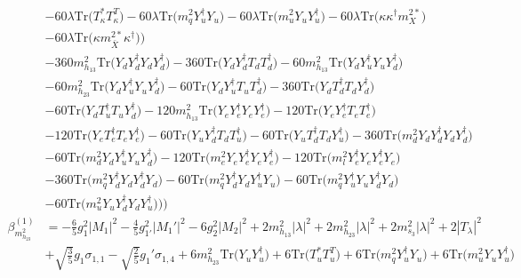 {\begin{align}
 &-60 \lambda \mbox{Tr}\Big({T_{\kappa}^*  T_{\kappa}^{T}}\Big) -60 \lambda \mbox{Tr}\Big({m_q^2  Y_{u}^{\dagger}  Y_u}\Big) -60 \lambda \mbox{Tr}\Big({m_u^2  Y_u  Y_{u}^{\dagger}}\Big) -60 \lambda \mbox{Tr}\Big({\kappa  \kappa^{\dagger}  m_{X}^{2 *}}\Big) \nonumber \\ 
 &-60 \lambda \mbox{Tr}\Big({\kappa  m_{\bar{X}}^{2 *}  \kappa^{\dagger}}\Big) \Big)\nonumber \\ 
 &-360 m_{h_{13}}^2 \mbox{Tr}\Big({Y_d  Y_{d}^{\dagger}  Y_d  Y_{d}^{\dagger}}\Big) -360 \mbox{Tr}\Big({Y_d  Y_{d}^{\dagger}  T_d  T_{d}^{\dagger}}\Big) -60 m_{h_{13}}^2 \mbox{Tr}\Big({Y_d  Y_{u}^{\dagger}  Y_u  Y_{d}^{\dagger}}\Big) \nonumber \\ 
 &-60 m_{h_{23}}^2 \mbox{Tr}\Big({Y_d  Y_{u}^{\dagger}  Y_u  Y_{d}^{\dagger}}\Big) -60 \mbox{Tr}\Big({Y_d  Y_{u}^{\dagger}  T_u  T_{d}^{\dagger}}\Big) -360 \mbox{Tr}\Big({Y_d  T_{d}^{\dagger}  T_d  Y_{d}^{\dagger}}\Big) \nonumber \\ 
 &-60 \mbox{Tr}\Big({Y_d  T_{u}^{\dagger}  T_u  Y_{d}^{\dagger}}\Big) -120 m_{h_{13}}^2 \mbox{Tr}\Big({Y_e  Y_{e}^{\dagger}  Y_e  Y_{e}^{\dagger}}\Big) -120 \mbox{Tr}\Big({Y_e  Y_{e}^{\dagger}  T_e  T_{e}^{\dagger}}\Big) \nonumber \\ 
 &-120 \mbox{Tr}\Big({Y_e  T_{e}^{\dagger}  T_e  Y_{e}^{\dagger}}\Big) -60 \mbox{Tr}\Big({Y_u  Y_{d}^{\dagger}  T_d  T_{u}^{\dagger}}\Big) -60 \mbox{Tr}\Big({Y_u  T_{d}^{\dagger}  T_d  Y_{u}^{\dagger}}\Big) -360 \mbox{Tr}\Big({m_d^2  Y_d  Y_{d}^{\dagger}  Y_d  Y_{d}^{\dagger}}\Big) \nonumber \\ 
 &-60 \mbox{Tr}\Big({m_d^2  Y_d  Y_{u}^{\dagger}  Y_u  Y_{d}^{\dagger}}\Big) -120 \mbox{Tr}\Big({m_e^2  Y_e  Y_{e}^{\dagger}  Y_e  Y_{e}^{\dagger}}\Big) -120 \mbox{Tr}\Big({m_l^2  Y_{e}^{\dagger}  Y_e  Y_{e}^{\dagger}  Y_e}\Big) \nonumber \\ 
 &-360 \mbox{Tr}\Big({m_q^2  Y_{d}^{\dagger}  Y_d  Y_{d}^{\dagger}  Y_d}\Big) -60 \mbox{Tr}\Big({m_q^2  Y_{d}^{\dagger}  Y_d  Y_{u}^{\dagger}  Y_u}\Big) -60 \mbox{Tr}\Big({m_q^2  Y_{u}^{\dagger}  Y_u  Y_{d}^{\dagger}  Y_d}\Big) \nonumber \\ 
 &-60 \mbox{Tr}\Big({m_u^2  Y_u  Y_{d}^{\dagger}  Y_d  Y_{u}^{\dagger}}\Big) \Big)\Big)\\ 
\beta_{m_{h_{23}}^2}^{(1)} & =  
-\frac{6}{5} g_{1}^{2} |M_1|^2 -\frac{4}{5} g_{1'}^{2} |M_1'|^2 -6 g_{2}^{2} |M_2|^2 +2 m_{h_{13}}^2 |\lambda|^2 +2 m_{h_{23}}^2 |\lambda|^2 +2 m_{s_3}^2 |\lambda|^2 +2 |T_{\lambda}|^2 \nonumber \\ 
 &+\sqrt{\frac{3}{5}} g_1 \sigma_{1,1} - \sqrt{\frac{2}{5}} g_1' \sigma_{1,4} +6 m_{h_{23}}^2 \mbox{Tr}\Big({Y_u  Y_{u}^{\dagger}}\Big) +6 \mbox{Tr}\Big({T_u^*  T_{u}^{T}}\Big) +6 \mbox{Tr}\Big({m_q^2  Y_{u}^{\dagger}  Y_u}\Big) +6 \mbox{Tr}\Big({m_u^2  Y_u  Y_{u}^{\dagger}}\Big) \\ 

\end{align}}
